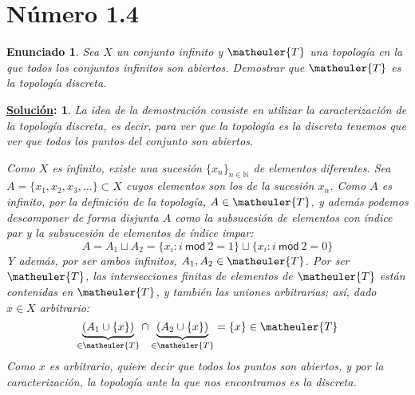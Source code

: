 \documentclass[10pt,a4paper,openright]{book}
\theoremstyle{break}
\newtheorem*{enun}{Enunciado}
\newtheorem*{sol}{\underline{Solución}:}
\begin{document}
\section{Número 1.4}
\begin{enun}
Sea $X$ un conjunto infinito y $\matheuler{T}$ una topología en la que todos los conjuntos infinitos son abiertos. Demostrar que $\matheuler{T}$ es la topología discreta.
\end{enun}
\begin{sol}
La idea de la demostración consiste en utilizar la caracterización de la topología discreta, es decir, para ver que la topología es la discreta tenemos que ver que todos los puntos del conjunto son abiertos.

Como $X$ es infinito, existe una sucesión $\{x_n\}_{n \in \mathbb{N}}$ de elementos diferentes. Sea $A = \{x_1, x_2,x_3,\ldots \} \subset X$ cuyos elementos son los de la sucesión $x_n$. Como $A$ es infinito, por la definición de la topología, $A \in \matheuler{T}$, y además podemos descomponer de forma disjunta $A$ como la subsucesión de elementos con índice par y la subsucesión de elementos de índice impar:
$$A = A_1 \sqcup A_2 = \{x_i : i \ \mathsf{mod} \ 2 = 1\} \sqcup \{x_i : i\  \mathsf{mod} \ 2 = 0\}$$
Y además, por ser ambos infinitos, $A_1, A_2 \in \matheuler{T}$. Por ser $\matheuler{T}$, las intersecciones finitas de elementos de $\matheuler{T}$ están contenidas en $\matheuler{T}$, y también las uniones arbitrarias; así, dado $x \in X$ arbitrario:
$$\underbrace{(A_1 \cup \{x\})}_{\in \matheuler{T}} \cap \underbrace{(A_2 \cup \{x\})}_{\in \matheuler{T}} = \{x\} \in \matheuler{T}$$
Como $x$ es arbitrario, quiere decir que todos los puntos son abiertos, y por la caracterización, la topología ante la que nos encontramos es la discreta.
\end{sol}
\end{document}
